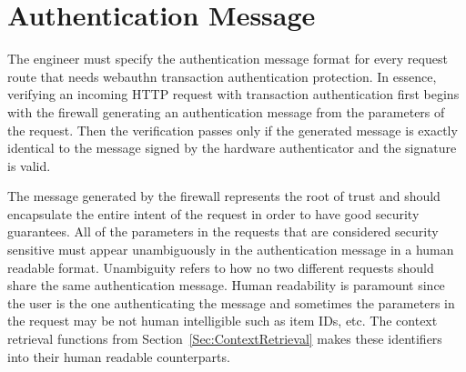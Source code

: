 






\section{Authentication Message}\label{Sec:AuthenticationMessage}

The engineer must specify the authentication message format for every request route that needs webauthn transaction authentication protection. In essence, verifying an incoming HTTP request with transaction authentication first begins with the firewall generating an authentication message from the parameters of the request. Then the verification passes only if the generated message is exactly identical to the message signed by the hardware authenticator and the signature is valid.

The message generated by the firewall represents the root of trust and should encapsulate the entire intent of the request in order to have good security guarantees. All of the parameters in the requests that are considered security sensitive must appear unambiguously in the authentication message in a human readable format. Unambiguity refers to how no two different requests should share the same authentication message. Human readability is paramount since the user is the one authenticating the message and sometimes the parameters in the request may be not human intelligible such as item IDs, etc. The context retrieval functions from Section~\ref{Sec:ContextRetrieval} makes these identifiers into their human readable counterparts.

